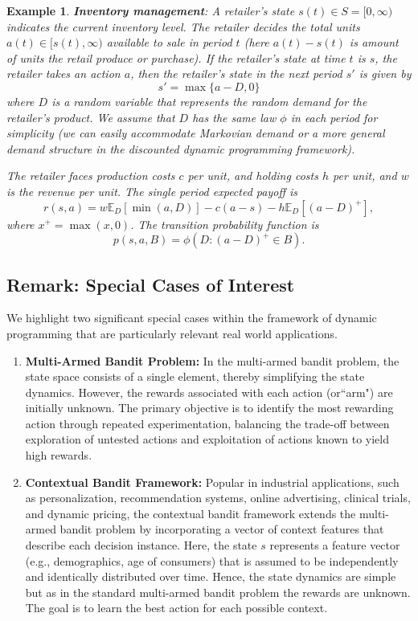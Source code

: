\documentclass[letter,11pt]{article}
\newtheorem{example}{Example}[section]
\begin{document}
\begin{example}
\textbf{Inventory management}: A retailer's state \(s(t) \in S = [0,\infty) \) indicates the current inventory level. The retailer decides the total units \(a(t) \in [s(t), \infty)\) available to sale in period $t$ (here $a(t) - s(t)$ is amount of units the retail produce or purchase). If the retailer's state at time  $t $ is $s$, the retailer takes an action $a$, then the retailer's state in the next period $s'$ is given by
\begin{equation*} s' =\max \{a  - D,0\}
\end{equation*}
where $D$ is a random variable that represents the random demand for the retailer's  product.  We assume that $D$ has the same law $\phi$ in each period for simplicity (we can easily accommodate Markovian demand or a more general demand structure in the discounted dynamic programming framework). 

The retailer faces production costs $c$ per unit, and holding costs \(h\) per unit, and \(w\) is the revenue per unit. The single period  expected  payoff is
\[
r(s, a) = w \mathbb{E}_{D}[\min(a, D)] - c(a - s) - h \mathbb{E}_{D}[(a - D)^+],
\]
where \(x^+ = \max(x, 0)\). The transition probability function is
\[
p(s, a, B) = \phi(D : (a-D)^{+} \in B).
\]
\end{example}

\subsection*{Remark: Special Cases of Interest}
We highlight two significant special cases within the framework of dynamic programming that are particularly relevant real world applications. 

\begin{enumerate}
    \item \textbf{Multi-Armed Bandit Problem:}
    In the multi-armed bandit problem, the state space consists of a single element, thereby simplifying the state dynamics. However, the rewards associated with each action (or``arm") are initially unknown. The primary objective is to identify the most rewarding action through repeated experimentation, balancing the trade-off between exploration of untested actions and exploitation of actions known to yield high rewards. 
    
    \item \textbf{Contextual Bandit Framework:}
    Popular in industrial applications, such as personalization,  recommendation systems, online advertising, clinical trials, and dynamic pricing, the contextual bandit framework extends the multi-armed bandit problem by incorporating a vector of context features that describe each decision instance. Here, the state \(s\) represents a feature vector (e.g., demographics, age of consumers) that is assumed to be independently and identically distributed over time. Hence,  the state dynamics are simple but as in the standard multi-armed bandit problem the rewards are unknown. The goal is to learn the best action for each possible context. 
\end{enumerate}
\end{document}
